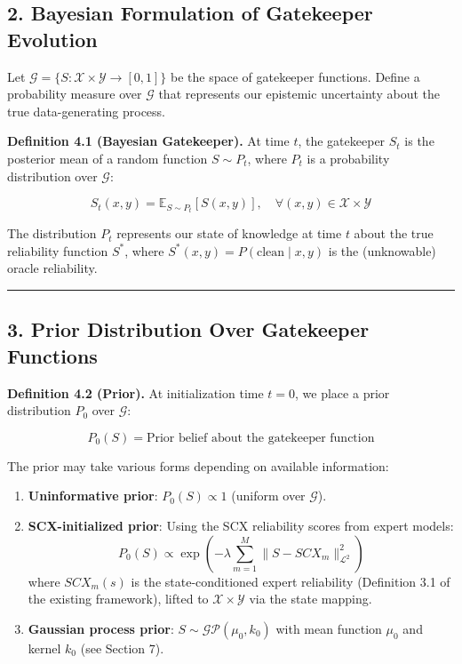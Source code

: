\documentclass[
  12pt,
]{article}
\providecommand{\tightlist}{%
  \setlength{\itemsep}{0pt}\setlength{\parskip}{0pt}}
\begin{document}
\subsection{2. Bayesian Formulation of Gatekeeper
Evolution}\label{bayesian-formulation-of-gatekeeper-evolution}

Let \(\mathcal{G} = \{S: \mathcal{X} \times \mathcal{Y} \to [0,1]\}\) be
the space of gatekeeper functions. Define a probability measure over
\(\mathcal{G}\) that represents our epistemic uncertainty about the true
data-generating process.

\textbf{Definition 4.1 (Bayesian Gatekeeper).} At time \(t\), the
gatekeeper \(S_t\) is the posterior mean of a random function
\(S \sim P_t\), where \(P_t\) is a probability distribution over
\(\mathcal{G}\):

\[
S_t(x,y) = \mathbb{E}_{S \sim P_t}[S(x,y)], \quad \forall (x,y) \in \mathcal{X} \times \mathcal{Y}
\]

The distribution \(P_t\) represents our state of knowledge at time \(t\)
about the true reliability function \(S^*\), where
\(S^*(x,y) = P(\text{clean} \mid x, y)\) is the (unknowable) oracle
reliability.

\begin{center}\rule{0.5\linewidth}{0.5pt}\end{center}

\subsection{3. Prior Distribution Over Gatekeeper
Functions}\label{prior-distribution-over-gatekeeper-functions}

\textbf{Definition 4.2 (Prior).} At initialization time \(t=0\), we
place a prior distribution \(P_0\) over \(\mathcal{G}\):

\[
P_0(S) = \text{Prior belief about the gatekeeper function}
\]

The prior may take various forms depending on available information:

\begin{enumerate}
\def\labelenumi{\arabic{enumi}.}
\tightlist
\item
  \textbf{Uninformative prior}: \(P_0(S) \propto 1\) (uniform over
  \(\mathcal{G}\)).
\item
  \textbf{SCX-initialized prior}: Using the SCX reliability scores from
  expert models:
  \[P_0(S) \propto \exp\left(-\lambda \sum_{m=1}^M \|S - SCX_m\|^2_{\mathcal{L}^2}\right)\]
  where \(SCX_m(s)\) is the state-conditioned expert reliability
  (Definition 3.1 of the existing framework), lifted to
  \(\mathcal{X} \times \mathcal{Y}\) via the state mapping.
\item
  \textbf{Gaussian process prior}: \(S \sim \mathcal{GP}(\mu_0, k_0)\)
  with mean function \(\mu_0\) and kernel \(k_0\) (see Section 7).
\end{enumerate}
\end{document}
